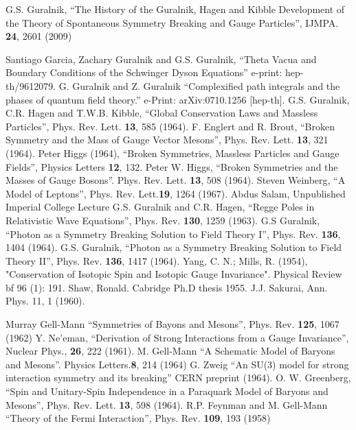 \documentclass[letterpaper,twoside,preprintnumbers,slac_one]{revtex4}
\begin{document}
\bigskip %
\begin{thebibliography}{99}
 G.S. Guralnik, ``The History of the Guralnik, Hagen and
  Kibble Development of the Theory of Spontaneous Symmetry Breaking and Gauge
  Particles'', IJMPA. {\bf 24}, 2601 (2009)

 Santiago Garcia, Zachary Guralnik and G.S. Guralnik, ``Theta
  Vacua and Boundary Conditions of the Schwinger Dyson Equations'' e-print:
  hep-th/9612079.
 G. Guralnik and Z. Guralnik ``Complexified path integrals
  and the phases of quantum field theory.'' e-Print: arXiv:0710.1256 [hep-th].
 G.S. Guralnik, C.R. Hagen and T.W.B. Kibble, ``Global
  Conservation Laws and Massless Particles'',  Phys. Rev. Lett. {\bf 13}, 585 (1964).
 F. Englert and R. Brout, ``Broken Symmetry and the Mass of
  Gauge Vector Mesons'', Phys. Rev. Lett. {\bf 13}, 321 (1964).
 Peter Higgs (1964), ``Broken Symmetries, Massless Particles
  and Gauge Fields'', Physics Letters {\bf 12}, 132.
 Peter W. Higgs, ``Broken Symmetries and the Masses of Gauge
  Bosons''. Phys. Rev. Lett. {\bf 13}, 508 (1964).
 Steven Weinberg, ``A Model of Leptons'', Phys. Rev. Lett.{\bf 19}, 1264
  (1967).
 Abdus Salam, Unpublished Imperial College Lecture
  G.S. Guralnik and C.R. Hagen, ``Regge Poles in Relativistic
  Wave Equations'', Phys. Rev. {\bf 130}, 1259 (1963).
 G.S Guralnik, ``Photon as a Symmetry Breaking Solution to
  Field Theory I'', Phys. Rev. {\bf 136}, 1404 (1964).
 G.S. Guralnik, ``Photon as a Symmetry Breaking Solution to
  Field Theory II'', Phys. Rev. {\bf 136}, 1417 (1964).
 Yang, C. N.; Mills, R. (1954), "Conservation of Isotopic Spin and
 Isotopic Gauge Invariance". Physical Review {bf 96 }(1): 191.
 Shaw, Ronald. Cabridge Ph.D thesis 1955.
 J.J. Sakurai, Ann. Phys. 11, 1 (1960).

 Murray Gell-Mann ``Symmetries of Bayons and Mesons'', Phys. Rev. {\bf 125}, 1067 (1962)
 Y. Ne'eman, ``Derivation of Strong Interactions from
  a Gauge Invariance'', Nuclear Phys., {\bf 26}, 222 (1961).
 M. Gell-Mann ``A Schematic Model of Baryons and Mesons''. Physics Letters.{\bf 8}, 214 (1964)
 G. Zweig ``An SU(3) model for strong interaction
  symmetry and its breaking'' CERN preprint (1964).
 O. W. Greenberg, ``Spin and Unitary-Spin Independence in a
  Paraquark Model of Baryons and Mesons'', Phys. Rev. Lett. {\bf 13}, 598 (1964).
 R.P. Feynman and M. Gell-Mann ``Theory of the Fermi Interaction'',
Phys. Rev. {\bf 109}, 193 (1958)


\end{thebibliography}
\end{document}

